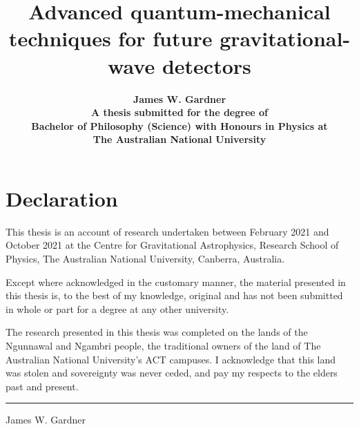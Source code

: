 \documentclass[onecolumn,12pt,a4paper,openany,oneside]{book}
\begin{document}

\begin{titlepage}
\title{ \textbf{Advanced quantum-mechanical techniques for future gravitational-wave detectors}\\[2cm]}
\author{\textbf{James W. Gardner}\\[6cm]
\textbf{A thesis submitted for the degree of}\\
\textbf{Bachelor of Philosophy (Science) with Honours in Physics at} \\
\textbf{The Australian National University}\\[1cm]}
\date{\textbf{\thismonth}}
\maketitle
\end{titlepage}
 
\sloppy


\chapter*{Declaration}

This thesis is an account of research undertaken between February 2021 and October 2021 at the Centre for Gravitational Astrophysics, Research School of Physics, The Australian National University, Canberra, Australia.

Except where acknowledged in the customary manner, the material presented in this thesis is, to the best of my knowledge, original and has not been submitted in whole or part for a degree at any other university.

The research presented in this thesis was completed on the lands of the Ngunnawal and Ngambri people, the traditional owners of the land of The Australian National University's ACT campuses. I acknowledge that this land was stolen and sovereignty was never ceded, and pay my respects to the elders past and present.

\vspace{20mm}
\hspace{80mm}\rule{40mm}{.15mm}\par
\hspace{80mm} James W. Gardner\par
\hspace{80mm} \thismonth
\end{document}
